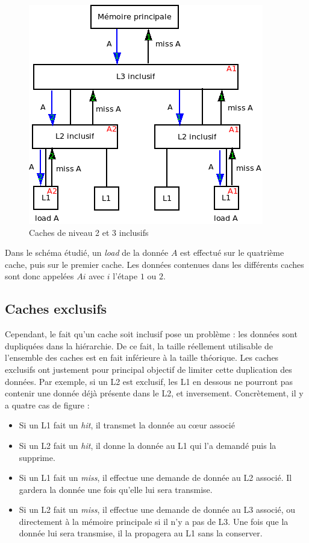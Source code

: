 \begin{figure}[H]
\begin{center}
   \includegraphics[scale=0.7]{images/inclusifs.png}
   \caption{\label{img:inclusifs} Caches de niveau 2 et 3 inclusifs}
\end{center}
\end{figure}

Dans le schéma étudié, un \emph{load} de la donnée $A$ est effectué sur le quatrième cache, puis sur le premier cache. Les données contenues dans les différents caches sont donc appelées $Ai$ avec $i$ l'étape $1$ ou $2$.

\subsection{Caches exclusifs}
Cependant, le fait qu'un cache soit inclusif pose un problème : les données sont dupliquées dans la hiérarchie. De ce fait, la taille réellement utilisable de l'ensemble des caches est en fait inférieure à la taille théorique. Les caches exclusifs ont justement pour principal objectif de limiter cette duplication des données. Par exemple, si un L2 est exclusif, les L1 en dessous ne pourront pas contenir une donnée déjà présente dans le L2, et inversement. Concrètement, il y a quatre cas de figure : \\

\begin{itemize}
\item Si un L1 fait un \textit{hit}, il transmet la donnée au c{\oe}ur associé
\item Si un L2 fait un \textit{hit}, il donne la donnée au L1 qui l'a demandé puis la supprime.
\item Si un L1 fait un \textit{miss}, il effectue une demande de donnée au L2 associé. Il gardera la donnée une fois qu'elle lui sera transmise.
\item Si un L2 fait un \textit{miss}, il effectue une demande de donnée au L3 associé, ou directement à la mémoire principale si il n'y a pas de L3. Une fois que la donnée lui sera transmise, il la propagera au L1 sans la conserver. \\
\end{itemize}

